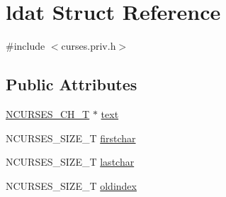 \hypertarget{structldat}{\section{ldat Struct Reference}
\label{structldat}
}


{\ttfamily \#include $<$curses.\-priv.\-h$>$}

\subsection*{Public Attributes}
\begin{DoxyCompactItemize}
\item 
\hyperlink{curses_8priv_8h_a04df53f09b2555aa1f2cee78235c33cd}{N\-C\-U\-R\-S\-E\-S\-\_\-\-C\-H\-\_\-\-T} $\ast$ \hyperlink{structldat_a1fa80aebdc51335b1108c7e115abcb0b}{text}
\item 
N\-C\-U\-R\-S\-E\-S\-\_\-\-S\-I\-Z\-E\-\_\-\-T \hyperlink{structldat_a979c04fa59dceccb042001e9bb30f6f9}{firstchar}
\item 
N\-C\-U\-R\-S\-E\-S\-\_\-\-S\-I\-Z\-E\-\_\-\-T \hyperlink{structldat_a96581e4fc676d49e5bec0328586fda26}{lastchar}
\item 
N\-C\-U\-R\-S\-E\-S\-\_\-\-S\-I\-Z\-E\-\_\-\-T \hyperlink{structldat_a1e11ff63417ab82a3074860c79db74bb}{oldindex}
\end{DoxyCompactItemize}


